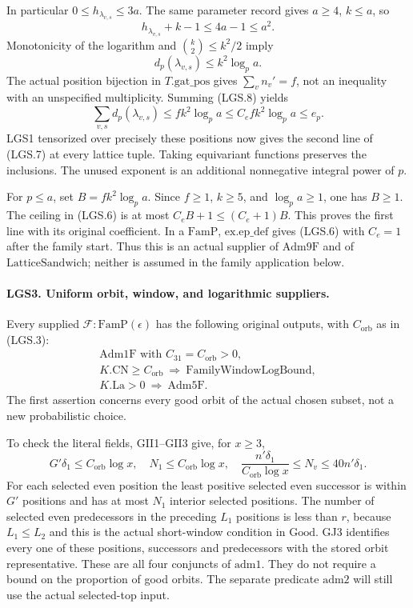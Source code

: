 In particular \(0\le h_{\lambda_{v,s}}\le3a\).
The same parameter record gives \(a\ge4\), \(k\le a\), so
\[
       h_{\lambda_{v,s}}+k-1\le4a-1\le a^2.
 \]
Monotonicity of the logarithm and
\(\binom{k}{2}\le k^2/2\) imply
\[
 d_p(\lambda_{v,s})\le k^2\log_p a.                   \tag{LGS.8}
\]
The actual position bijection in \(T.\mathrm{gat\_pos}\) gives
\(\sum_v n_v'=f\), not an inequality with an unspecified
multiplicity.  Summing (LGS.8) yields
\[
 \sum_{v,s}d_p(\lambda_{v,s})
       \le fk^2\log_p a\le C_e fk^2\log_p a\le e_p.
 \]
LGS1 tensorized over precisely these positions now gives the
second line of (LGS.7) at every lattice tuple.  Taking equivariant
functions preserves the inclusions.  The unused exponent is an
additional nonnegative integral power of \(p\).

For \(p\le a\), set \(B=fk^2\log_p a\).  Since \(f\ge1\),
\(k\ge5\), and \(\log_p a\ge1\), one has \(B\ge1\).
The ceiling in (LGS.6) is at most \(C_eB+1\le(C_e+1)B\).
This proves the first line with its original coefficient.
In a \(\mathrm{FamP}\), \(\mathrm{ex.ep\_def}\) gives (LGS.6)
with \(C_e=1\) after the family start.  Thus this is an actual
supplier of \(\mathrm{Adm9F}\) and of
\(\mathrm{LatticeSandwich}\); neither is assumed in the
family application below.

\paragraph{LGS3. Uniform orbit, window, and logarithmic suppliers.}
\label{claim:LGS3}
Every supplied \(\mathcal F:\mathrm{FamP}(\epsilon)\) has the
following original outputs, with \(C_{\mathrm{orb}}\) as in
(LGS.3):
\[
 \begin{gathered}
 \mathrm{Adm1F}\text{ with }C_{31}=C_{\mathrm{orb}}>0,\\
 K.\mathrm{CN}\ge C_{\mathrm{orb}}
       \ \Longrightarrow\ \mathrm{FamilyWindowLogBound},\\
 K.\mathrm{La}>0
       \ \Longrightarrow\ \mathrm{Adm5F}.
 \end{gathered}                                                   \tag{LGS.9}
\]
The first assertion concerns every good orbit of the actual
chosen subset, not a new probabilistic choice.

To check the literal fields, GII1--GII3 give, for \(x\ge3\),
\[
 G'\delta_1\le C_{\mathrm{orb}}\log x,\quad
 N_1\le C_{\mathrm{orb}}\log x,\quad
 \frac{n'\delta_1}{C_{\mathrm{orb}}\log x}
       \le N_v\le40n'\delta_1.                         \tag{LGS.10}
\]
For each selected even position the least positive selected
even successor is within \(G'\) positions and has at most
\(N_1\) interior selected positions.  The number of selected
even predecessors in the preceding \(L_1\) positions is less
than \(r\), because \(L_1\le L_2\) and this is the actual
short-window condition in \(\mathrm{Good}\).
GJ3 identifies every one of these positions, successors and
predecessors with the stored orbit representative.
These are all four conjuncts of \(\mathrm{adm1}\).
They do not require a bound on the proportion of good orbits.
The separate predicate \(\mathrm{adm2}\) will still use the
actual selected-top input.

